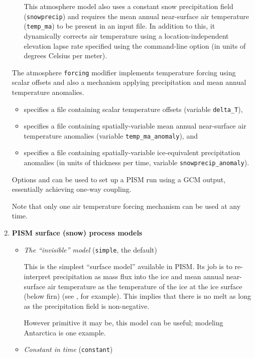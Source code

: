 \begin{enumerate}
\begin{itemize}
    This atmosphere model also uses a constant snow precipitation field (\verb|snowprecip|) and requires the mean annual near-surface air temperature (\verb|temp_ma|) to be present in an input file. In addition to this, it dynamically corrects air temperature using a location-independent elevation lapse rate specified using the  command-line option (in units of degrees Celsius per meter).
 \end{itemize}

  The atmosphere \verb|forcing| modifier implements temperature forcing using scalar offsets and also a mechanism applying precipitation and mean annual temperature anomalies.
  \begin{itemize}
  \item {} specifies a file containing scalar temperature offsets (variable \verb|delta_T|), 
  \item {} specifies a file containing spatially-variable mean annual near-surface air temperature anomalies (variable \verb|temp_ma_anomaly|), and
  \item {} specifies a file containing spatially-variable ice-equivalent precipitation anomalies (in units of thickness per time, variable \verb|snowprecip_anomaly|).
  \end{itemize}

  Options  and  can be used to set up a PISM run using a GCM output, essentially achieving one-way coupling.

  Note that only one air temperature forcing mechanism can be used at any time.

\item \textbf{PISM surface (snow) process models}
  \begin{itemize}
  \item \emph{The ``invisible'' model} (\verb|simple|, the default)

    This is the simplest ``surface model'' available in PISM. Its job is to re-interpret  precipitation as mass flux into the ice and mean annual near-surface air temperature as the temperature of the ice at the ice surface (below firn) (see \cite{Hock05}, for example). This implies that there is no melt as long as the precipitation field  is non-negative.

    However primitive it may be, this model can be useful; modeling Antarctica is one example.
  \item \emph{Constant in time} (\verb|constant|)


\end{itemize}
\end{enumerate}

